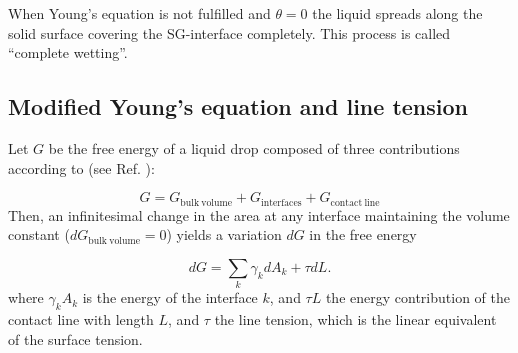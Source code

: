 When Young's equation is not fulfilled and $\theta=0$ the liquid
spreads along the solid surface covering the SG-interface completely.
This process is called ``complete wetting''.

\subsection{Modified Young's equation and line tension}

Let $G$ be the free energy of a liquid drop composed of three contributions
according to (see Ref. \cite{weijs:2011}):

\begin{equation}
G=G_{\mathrm{bulk\ volume}}+G_{\mathrm{interfaces}}+G_{\mathrm{contact\ line}}
\end{equation}
 Then, an infinitesimal change in the area at any interface maintaining
the volume constant ($dG_{\mathrm{bulk\ volume}}=0$) yields a variation
$dG$ in the free energy

\begin{equation}
dG=\sum_{k}\gamma_{k}dA_{k}+\tau dL.\label{eq:deriv_free_energy}
\end{equation}
where $\gamma_{k}A_{k}$ is the energy of the interface $k$, and
$\tau L$ the energy contribution of the contact line with length
$L$, and $\tau$ the line tension, which is the linear equivalent
of the surface tension.